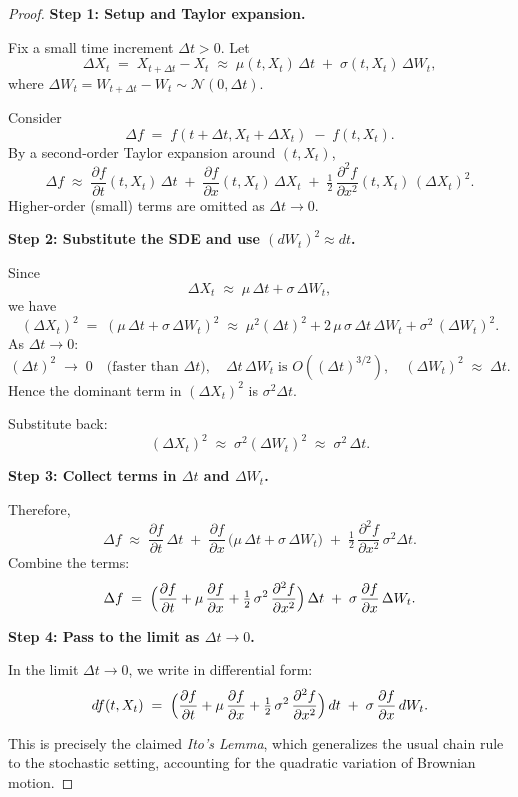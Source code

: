 \documentclass[a4paper,11pt]{book}
\theoremstyle{definition}
\theoremstyle{remark}
\begin{document}
\begin{proof}
\textbf{Step 1: Setup and Taylor expansion.}

Fix a small time increment $\Delta t > 0$. Let
\[
   \Delta X_t \;=\; X_{t+\Delta t} - X_t 
   \;\approx\; \mu(t, X_t)\,\Delta t \;+\; \sigma(t, X_t)\,\Delta W_t,
\]
where $\Delta W_t = W_{t+\Delta t} - W_t \sim \mathcal{N}(0,\Delta t)$.

Consider 
\[
   \Delta f \;=\; f(t + \Delta t, X_t + \Delta X_t) \;-\; f(t, X_t).
\]
By a second-order Taylor expansion around $(t, X_t)$,
\[
   \Delta f 
   \;\approx\;
   \frac{\partial f}{\partial t}(t,X_t)\,\Delta t
   \;+\;
   \frac{\partial f}{\partial x}(t,X_t)\,\Delta X_t
   \;+\;
   \tfrac{1}{2}\,\frac{\partial^2 f}{\partial x^2}(t,X_t)\,(\Delta X_t)^2.
\]
Higher-order (small) terms are omitted as $\Delta t \to 0$.

\medskip
\textbf{Step 2: Substitute the SDE and use $(dW_t)^2 \approx dt$.}

Since
\[
   \Delta X_t 
   \;\approx\;
   \mu\,\Delta t + \sigma\,\Delta W_t,
\]
we have
\[
   (\Delta X_t)^2
   \;=\;
   (\mu\,\Delta t + \sigma\,\Delta W_t)^2
   \;\approx\;
   \mu^2 (\Delta t)^2 + 2\,\mu\,\sigma\,\Delta t\,\Delta W_t + \sigma^2\,(\Delta W_t)^2.
\]
As $\Delta t \to 0$:
\[
   (\Delta t)^2 \;\to\; 0 
   \quad\text{(faster than } \Delta t\text{)},
   \quad
   \Delta t \,\Delta W_t \;\text{is } O((\Delta t)^{3/2}),
   \quad
   (\Delta W_t)^2 \;\approx\; \Delta t.
\]
Hence the dominant term in $(\Delta X_t)^2$ is $\sigma^2 \Delta t$.

Substitute back:
\[
   (\Delta X_t)^2 \;\approx\; \sigma^2 (\Delta W_t)^2 \;\approx\; \sigma^2 \,\Delta t.
\]

\medskip
\textbf{Step 3: Collect terms in $\Delta t$ and $\Delta W_t$.}

Therefore,
\[
   \Delta f 
   \;\approx\;
   \frac{\partial f}{\partial t}\,\Delta t
   \;+\;
   \frac{\partial f}{\partial x}\,\bigl(\mu\,\Delta t + \sigma\,\Delta W_t\bigr)
   \;+\;
   \tfrac{1}{2}\,\frac{\partial^2 f}{\partial x^2}\,\sigma^2 \Delta t.
\]
Combine the terms:
\[
   \Delta f
   \;=\;
   \Bigl(\frac{\partial f}{\partial t} 
         + \mu\,\frac{\partial f}{\partial x} 
         + \tfrac{1}{2}\,\sigma^2\,\frac{\partial^2 f}{\partial x^2}\Bigr)\,\Delta t
   \;+\;
   \sigma\,\frac{\partial f}{\partial x}\,\Delta W_t.
\]

\medskip
\textbf{Step 4: Pass to the limit as $\Delta t \to 0$.}

In the limit $\Delta t \to 0$, we write in differential form:
\[
   df(t,X_t)
   \;=\;
   \Bigl(\frac{\partial f}{\partial t} 
         + \mu\,\frac{\partial f}{\partial x} 
         + \tfrac{1}{2}\,\sigma^2\,\frac{\partial^2 f}{\partial x^2}\Bigr)\,dt
   \;+\;
   \sigma\,\frac{\partial f}{\partial x}\,dW_t.
\]

This is precisely the claimed \emph{Ito's Lemma}, which generalizes the usual chain rule to the stochastic setting, accounting for the quadratic variation of Brownian motion.
\end{proof}
\end{document}
